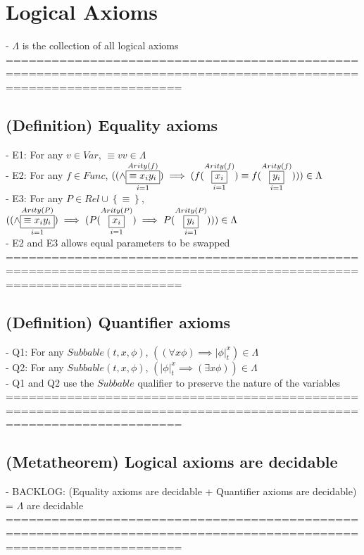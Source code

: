 \documentclass{book}
\newcommand{\set}[1]{\left\{ #1 \right\}}
\newcommand{\vdc}[3]{\underset{#2}{\overset{#3}{\fbox{$#1$}}}}
\newcommand{\sub}[3]{\left|#1\right|_{#3}^{#2}}
\begin{document}
\section{Logical Axioms}
	- $\Lambda$ is the collection of all logical axioms \\
	===================================================================================================================
\subsection{(Definition) Equality axioms} %
	- E1: For any $v \in Var$, $\equiv v v \in \Lambda$ \\
	- E2: For any $f \in Func$, $((\land \vdc{\equiv x_i y_i}{i=1}{Arity(f)}) \implies (f(\vdc{x_i}{i=1}{Arity(f)}) \equiv f(\vdc{y_i}{i=1}{Arity(f)}))) \in \Lambda$ \\
	- E3: For any $P \in Rel \cup \set{\equiv}$, $((\land \vdc{\equiv x_i y_i}{i=1}{Arity(P)}) \implies (P(\vdc{x_i}{i=1}{Arity(P)}) \implies P(\vdc{y_i}{i=1}{Arity(P)}))) \in \Lambda$ \\
	- E2 and E3 allows equal parameters to be swapped \\
	===================================================================================================================
\subsection{(Definition) Quantifier axioms} %
	- Q1: For any $Subbable(t, x, \phi)$, $((\forall x \phi) \implies \sub{\phi}{x}{t}) \in \Lambda$ \\
	- Q2: For any $Subbable(t, x, \phi)$, $(\sub{\phi}{x}{t} \implies (\exists x \phi)) \in \Lambda$ \\
	- Q1 and Q2 use the $Subbable$ qualifier to preserve the nature of the variables \\
		===================================================================================================================
\subsection{(Metatheorem) Logical axioms are decidable} %
	- BACKLOG: (Equality axioms are decidable + Quantifier axioms are decidable) = $\Lambda$ are decidable \\
	===================================================================================================================
\end{document}
